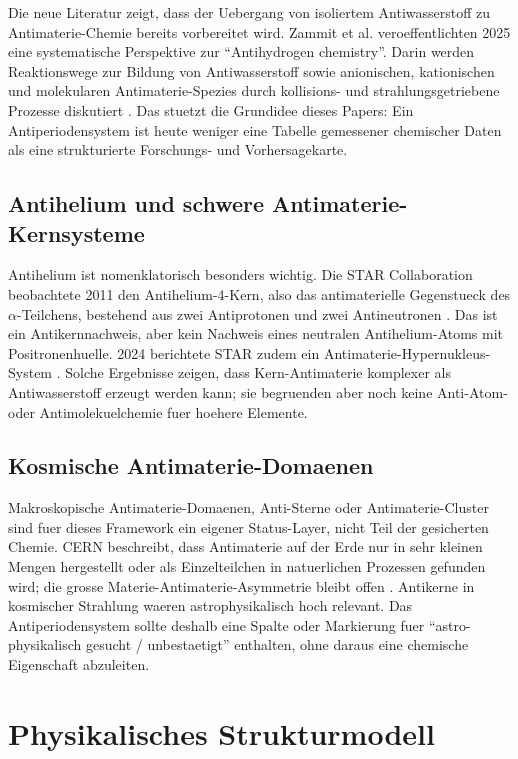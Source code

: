 \documentclass[11pt,a4paper]{article}
\begin{document}
Die neue Literatur zeigt, dass der Uebergang von isoliertem Antiwasserstoff zu Antimaterie-Chemie bereits vorbereitet wird. Zammit et al. veroeffentlichten 2025 eine systematische Perspektive zur \enquote{Antihydrogen chemistry}. Darin werden Reaktionswege zur Bildung von Antiwasserstoff sowie anionischen, kationischen und molekularen Antimaterie-Spezies durch kollisions- und strahlungsgetriebene Prozesse diskutiert \cite{Zammit2025}. Das stuetzt die Grundidee dieses Papers: Ein Antiperiodensystem ist heute weniger eine Tabelle gemessener chemischer Daten als eine strukturierte Forschungs- und Vorhersagekarte.

\subsection{Antihelium und schwere Antimaterie-Kernsysteme}

Antihelium ist nomenklatorisch besonders wichtig. Die STAR Collaboration beobachtete 2011 den Antihelium-4-Kern, also das antimaterielle Gegenstueck des $\alpha$-Teilchens, bestehend aus zwei Antiprotonen und zwei Antineutronen \cite{STAR2011}. Das ist ein Antikernnachweis, aber kein Nachweis eines neutralen Antihelium-Atoms mit Positronenhuelle. 2024 berichtete STAR zudem ein Antimaterie-Hypernukleus-System \cite{STAR2024}. Solche Ergebnisse zeigen, dass Kern-Antimaterie komplexer als Antiwasserstoff erzeugt werden kann; sie begruenden aber noch keine Anti-Atom- oder Antimolekuelchemie fuer hoehere Elemente.

\subsection{Kosmische Antimaterie-Domaenen}

Makroskopische Antimaterie-Domaenen, Anti-Sterne oder Antimaterie-Cluster sind fuer dieses Framework ein eigener Status-Layer, nicht Teil der gesicherten Chemie. CERN beschreibt, dass Antimaterie auf der Erde nur in sehr kleinen Mengen hergestellt oder als Einzelteilchen in natuerlichen Prozessen gefunden wird; die grosse Materie-Antimaterie-Asymmetrie bleibt offen \cite{CERNantimatter}. Antikerne in kosmischer Strahlung waeren astrophysikalisch hoch relevant. Das Antiperiodensystem sollte deshalb eine Spalte oder Markierung fuer \enquote{astro-physikalisch gesucht / unbestaetigt} enthalten, ohne daraus eine chemische Eigenschaft abzuleiten.

\section{Physikalisches Strukturmodell}
\end{document}
